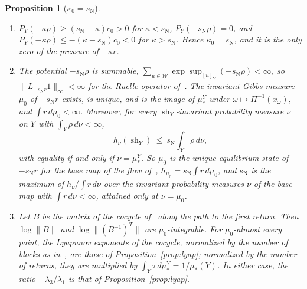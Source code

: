 \documentclass[11pt]{amsart}
\newtheorem{proposition}{Proposition}[section]
\theoremstyle{definition}
\theoremstyle{remark}
\newcommand{\sN}{s_{\mathrm N}}
\newcommand{\norm}[1]{\lVert #1\rVert}
\begin{document}
\begin{proposition}[$\kappa_0=\sN$]\label{prop:AHS}
\begin{enumerate}
\item[(i)] $P_Y(-\kappa\rho)\ge(\sN-\kappa)c_0>0$ for $\kappa<\sN$, $P_Y(-\sN\rho)=0$, and $P_Y(-\kappa\rho)\le-(\kappa-\sN)c_0<0$ for $\kappa>\sN$. Hence $\kappa_0=\sN$, and it is the only zero of the pressure of $-\kappa r$.
\item[(ii)] The potential $-\sN\rho$ is summable, $\sum_{u\in\mathcal W}\exp\sup_{[u]_Y}(-\sN\rho)<\infty$, so $\norm{L_{-\sN r}1}_\infty<\infty$ for the Ruelle operator of~\cite[\S5.1]{AHSinv}. The invariant Gibbs measure $\mu_0$ of $-\sN r$ exists, is unique, and is the image of $\mu_*^Y$ under $\omega\mapsto\Pi^{-1}(x_\omega)$, and $\int r\,d\mu_0<\infty$. Moreover, for every $\operatorname{sh}_Y$-invariant probability measure $\nu$ on $Y$ with $\int_Y\rho\,d\nu<\infty$,
\begin{equation}\label{eq:induced-entropy-bound}
  h_\nu(\operatorname{sh}_Y)\ \le\ \sN\int_Y\rho\,d\nu ,
\end{equation}
with equality if and only if $\nu=\mu_*^Y$. So $\mu_0$ is the unique equilibrium state of $-\sN r$ for the base map of the flow of~\cite{AHSinv}, $h_{\mu_0}=\sN\int r\,d\mu_0$, and $\sN$ is the maximum of $h_\nu/\int r\,d\nu$ over the invariant probability measures $\nu$ of the base map with $\int r\,d\nu<\infty$, attained only at $\nu=\mu_0$.
\item[(iii)] Let $B$ be the matrix of the cocycle of~\cite{AHSinv} along the path to the first return. Then $\log\norm B$ and $\log\norm{(B^{-1})^T}$ are $\mu_0$-integrable. For $\mu_0$-almost every point, the Lyapunov exponents of the cocycle, normalized by the number of blocks as in~\cite[Thm.~27]{AHSinv}, are those of Proposition~\ref{prop:lyap}; normalized by the number of returns, they are multiplied by $\int_Y\tau\,d\mu_*^Y=1/\mu_*(Y)$. In either case, the ratio $-\lambda_3/\lambda_1$ is that of Proposition~\ref{prop:lyap}.
\end{enumerate}
\end{proposition}
\end{document}

